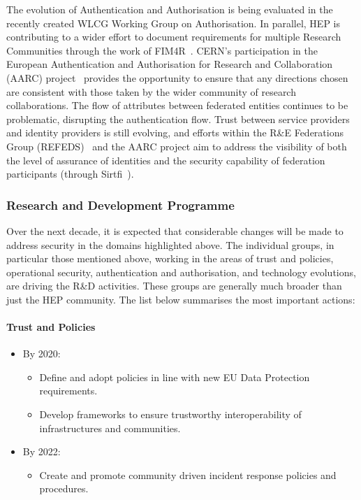 The evolution of Authentication and Authorisation is being evaluated in
the recently created WLCG Working Group on Authorisation.
In parallel, HEP is contributing to a wider effort
to document requirements for multiple Research Communities through the
work of FIM4R~\cite{FIM4R}. CERN's participation in the European
Authentication and Authorisation for Research and Collaboration (AARC)
project~\cite{AARC} provides the opportunity to ensure
that any directions chosen are consistent with those taken by the wider
community of research collaborations. The flow of attributes between
federated entities continues to be problematic, disrupting the
authentication flow. Trust between service providers and identity
providers is still evolving, and efforts within the R\&E Federations
Group (REFEDS)~\cite{REFEDS} and the AARC project aim to address the
visibility of both the level of assurance of identities and the security
capability of federation participants (through Sirtfi~\cite{Sirtfi}).

\subsubsection*{Research and Development Programme}

Over the next decade, it is expected that considerable changes will be
made to address security in the domains highlighted above. The
individual groups, in particular those mentioned above, working in the
areas of trust and policies, operational security, authentication and
authorisation, and technology evolutions, are driving the R\&D
activities. These groups are generally much broader than just the HEP
community. The list below summarises the most important actions:

\paragraph{Trust and Policies}
\begin{itemize}
\item
By 2020:
\begin{itemize}
    \item
      Define and adopt policies in line with new EU Data Protection
      requirements.
    \item
      Develop frameworks to ensure trustworthy interoperability of
      infrastructures and communities.
\end{itemize}

\item
By 2022:
\begin{itemize}
    \item
      Create and promote community driven incident response policies and
      procedures.
\end{itemize}
\end{itemize}

